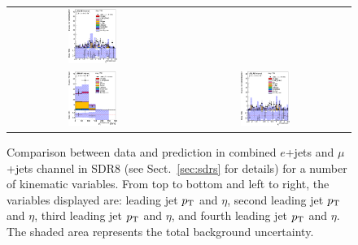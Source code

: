 \begin{figure}[htbp]
\begin{center}
\begin{tabular}{cc}
\includegraphics[width=0.30\textwidth]{appendices/figures/sdrs/JetEta3_ELEMUONCR8_1W_NOMINAL.eps} \\
\includegraphics[width=0.30\textwidth]{appendices/figures/sdrs/JetPt4_ELEMUONCR8_1W_NOMINAL.eps}  &
\includegraphics[width=0.30\textwidth]{appendices/figures/sdrs/JetEta4_ELEMUONCR8_1W_NOMINAL.eps}  \\
\end{tabular}\caption{\small {Comparison between data and prediction in combined $e$+jets and $\mu$+jets channel in SDR8 (see Sect.~\ref{sec:sdrs} for details) 
for a number of kinematic variables. From top to bottom and left to right, the variables displayed are: leading jet $\pt$ and $\eta$,  second leading jet $\pt$ and $\eta$,
third leading jet $\pt$ and $\eta$, and fourth leading jet $\pt$ and $\eta$. The shaded area represents the total background uncertainty.}}
\label{fig:ELEMUONCR8_2}
\end{center}
\end{figure}                                                                             

